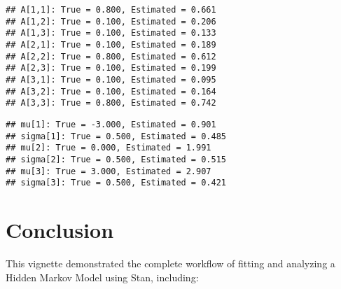 \documentclass[
]{article}
\newenvironment{Shaded}{\begin{snugshade}}{\end{snugshade}}
\newcommand{\CommentTok}[1]{\textcolor[rgb]{0.56,0.35,0.01}{\textit{#1}}}
\newcommand{\ControlFlowTok}[1]{\textcolor[rgb]{0.13,0.29,0.53}{\textbf{#1}}}
\newcommand{\DecValTok}[1]{\textcolor[rgb]{0.00,0.00,0.81}{#1}}
\newcommand{\FunctionTok}[1]{\textcolor[rgb]{0.13,0.29,0.53}{\textbf{#1}}}
\newcommand{\NormalTok}[1]{#1}
\newcommand{\SpecialCharTok}[1]{\textcolor[rgb]{0.81,0.36,0.00}{\textbf{#1}}}
\newcommand{\StringTok}[1]{\textcolor[rgb]{0.31,0.60,0.02}{#1}}
\begin{document}
\begin{verbatim}
## A[1,1]: True = 0.800, Estimated = 0.661
## A[1,2]: True = 0.100, Estimated = 0.206
## A[1,3]: True = 0.100, Estimated = 0.133
## A[2,1]: True = 0.100, Estimated = 0.189
## A[2,2]: True = 0.800, Estimated = 0.612
## A[2,3]: True = 0.100, Estimated = 0.199
## A[3,1]: True = 0.100, Estimated = 0.095
## A[3,2]: True = 0.100, Estimated = 0.164
## A[3,3]: True = 0.800, Estimated = 0.742
\end{verbatim}

\begin{Shaded}
\end{Shaded}

\begin{verbatim}
## mu[1]: True = -3.000, Estimated = 0.901
## sigma[1]: True = 0.500, Estimated = 0.485
## mu[2]: True = 0.000, Estimated = 1.991
## sigma[2]: True = 0.500, Estimated = 0.515
## mu[3]: True = 3.000, Estimated = 2.907
## sigma[3]: True = 0.500, Estimated = 0.421
\end{verbatim}

\section{Conclusion}\label{conclusion}

This vignette demonstrated the complete workflow of fitting and
analyzing a Hidden Markov Model using Stan, including:
\end{document}
